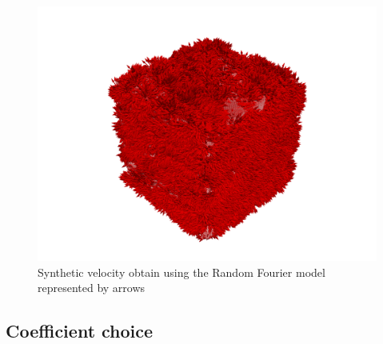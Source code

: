 \documentclass[a4paper,12pt]{article}
\theoremstyle{definition}
\begin{document}
\begin{figure}[H]
    \centering
    \includegraphics[width=\linewidth]{illustrations/VelocityFieldVTU.png}
    \caption{Synthetic velocity obtain using the Random Fourier model represented by arrows}
\end{figure}

\subsection{Coefficient choice} \label{Coefficient choice}
\end{document}
